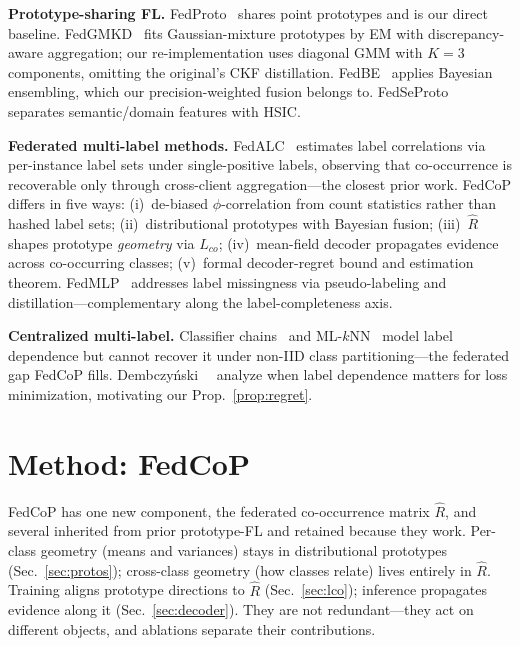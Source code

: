 \documentclass[10pt,twocolumn,letterpaper]{article}
\theoremstyle{definition}
\newcommand{\Rhat}{\widehat{R}}
\begin{document}
\noindent\textbf{Prototype-sharing FL.} FedProto~\cite{tan2022fedproto} shares point prototypes and is our direct baseline. FedGMKD~\cite{zhang2024fedgmkd} fits Gaussian-mixture prototypes by EM with discrepancy-aware aggregation; our re-implementation uses diagonal GMM with $K{=}3$ components, omitting the original's CKF distillation. FedBE~\cite{chen2021fedbe} applies Bayesian ensembling, which our precision-weighted fusion belongs to. FedSeProto~\cite{fedseproto2024} separates semantic/domain features with HSIC.

\noindent\textbf{Federated multi-label methods.} FedALC~\cite{an2024fedalc} estimates label correlations via per-instance label sets under single-positive labels, observing that co-occurrence is recoverable only through cross-client aggregation---the closest prior work. FedCoP differs in five ways: (i)~de-biased $\phi$-correlation from count statistics rather than hashed label sets; (ii)~distributional prototypes with Bayesian fusion; (iii)~$\Rhat$ shapes prototype \emph{geometry} via $L_{co}$; (iv)~mean-field decoder propagates evidence across co-occurring classes; (v)~formal decoder-regret bound and estimation theorem. FedMLP~\cite{sun2024fedmlp} addresses label missingness via pseudo-labeling and distillation---complementary along the label-completeness axis.

\noindent\textbf{Centralized multi-label.} Classifier chains~\cite{read2011classifier} and ML-$k$NN~\cite{zhang2007mlknn} model label dependence but cannot recover it under non-IID class partitioning---the federated gap FedCoP fills. Dembczy\'nski~\etal~\cite{dembczynski2012labeldependence} analyze when label dependence matters for loss minimization, motivating our Prop.~\ref{prop:regret}.

\section{Method: FedCoP}

FedCoP has one new component, the federated co-occurrence matrix $\Rhat$, and several inherited from prior prototype-FL and retained because they work. Per-class geometry (means and variances) stays in distributional prototypes (Sec.~\ref{sec:protos}); cross-class geometry (how classes relate) lives entirely in $\Rhat$. Training aligns prototype directions to $\Rhat$ (Sec.~\ref{sec:lco}); inference propagates evidence along it (Sec.~\ref{sec:decoder}). They are not redundant---they act on different objects, and ablations separate their contributions.
\end{document}
